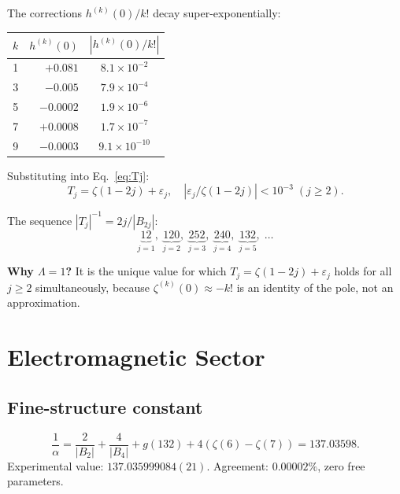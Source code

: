 \documentclass[aps,prd,twocolumn,superscriptaddress,nofootinbib]{revtex4-2}
\begin{document}
The corrections $h^{(k)}(0)/k!$ decay super-exponentially:

\begin{center}
\begin{tabular}{crc}
\toprule
$k$ & $h^{(k)}(0)$ & $|h^{(k)}(0)/k!|$ \\
\midrule
1 & $+0.081$ & $8.1\times 10^{-2}$ \\
3 & $-0.005$ & $7.9\times 10^{-4}$ \\
5 & $-0.0002$ & $1.9\times 10^{-6}$ \\
7 & $+0.0008$ & $1.7\times 10^{-7}$ \\
9 & $-0.0003$ & $9.1\times 10^{-10}$ \\
\bottomrule
\end{tabular}
\end{center}

Substituting into Eq.~\eqref{eq:Tj}:
\begin{equation}\label{eq:main}
  T_j = \zeta(1{-}2j)+\varepsilon_j,
  \quad |\varepsilon_j/\zeta(1{-}2j)|<10^{-3}\;(j\geq 2).
\end{equation}

The sequence $|T_j|^{-1}=2j/|B_{2j}|$:
\begin{equation}\label{eq:seq}
  \underbrace{12}_{j=1},\;
  \underbrace{120}_{j=2},\;
  \underbrace{252}_{j=3},\;
  \underbrace{240}_{j=4},\;
  \underbrace{132}_{j=5},\;\ldots
\end{equation}

\noindent\textbf{Why $\Lambda=1$?}  It is the unique value for which
$T_j=\zeta(1{-}2j)+\varepsilon_j$ holds for all $j\geq 2$
simultaneously, because $\zeta^{(k)}(0)\approx -k!$ is an identity
of the pole, not an approximation.

\section{Electromagnetic Sector}\label{sec:alpha}

\subsection{Fine-structure constant}

\begin{equation}\label{eq:alpha}
  \frac{1}{\alpha}=\frac{2}{|B_2|}+\frac{4}{|B_4|}+g(132)
  +4(\zeta(6)-\zeta(7))=137.03598.
\end{equation}
Experimental value: $137.035999084(21)$.
Agreement: $\mathbf{0.00002\%}$, zero free parameters.
\end{document}
